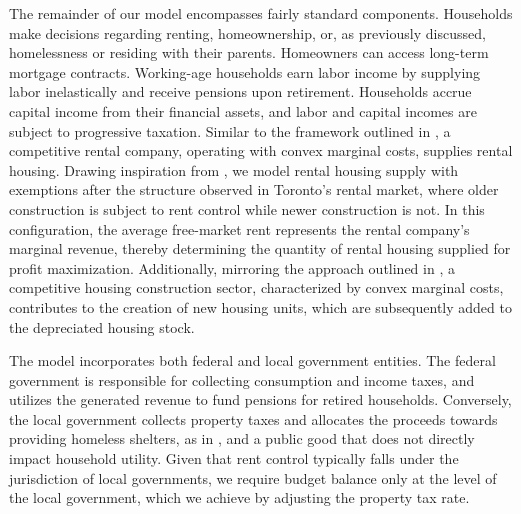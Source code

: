 \documentclass[parskip=full]{article}
\begin{document}
The remainder of our model encompasses fairly standard components. Households make decisions regarding renting, homeownership, or, as previously discussed, homelessness or residing with their parents. Homeowners can access long-term mortgage contracts. Working-age households earn labor income by supplying labor inelastically and receive pensions upon retirement. Households accrue capital income from their financial assets, and labor and capital incomes are subject to progressive taxation. Similar to the framework outlined in \citet{garrigaeetal-2009}, a competitive rental company, operating with convex marginal costs, supplies rental housing. Drawing inspiration from \citet{fallis-1985}, we model rental housing supply with exemptions after the structure observed in Toronto's rental market, where older construction is subject to rent control while newer construction is not. In this configuration, the average free-market rent represents the rental company's marginal revenue, thereby determining the quantity of rental housing supplied for profit maximization. Additionally, mirroring the approach outlined in \citet{rotberg-2022}, a competitive housing construction sector, characterized by convex marginal costs, contributes to the creation of new housing units, which are subsequently added to the depreciated housing stock.

The model incorporates both federal and local government entities. The federal government is responsible for collecting consumption and income taxes, and utilizes the generated revenue to fund pensions for retired households. Conversely, the local government collects property taxes and allocates the proceeds towards providing homeless shelters, as in \citet{abramson-2024}, and a public good that does not directly impact household utility. Given that rent control typically falls under the jurisdiction of local governments, we require budget balance only at the level of the local government, which we achieve by adjusting the property tax rate.
\end{document}
